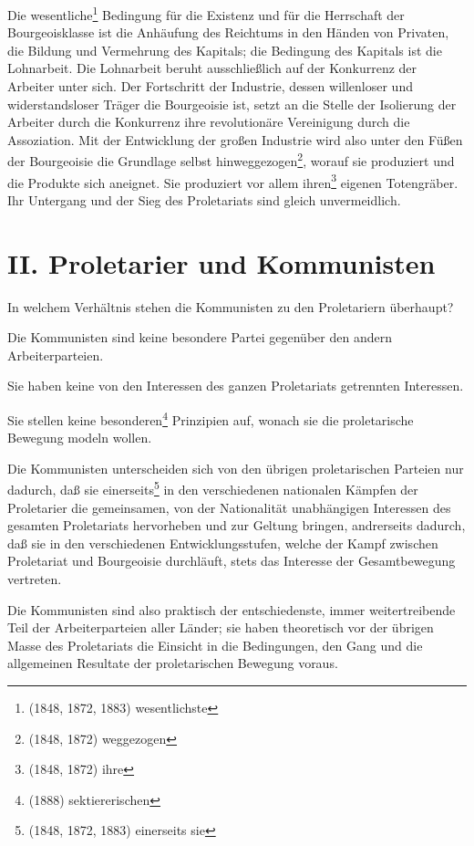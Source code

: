 \documentclass[letterpaper]{article}
\begin{document}
Die wesentliche\footnote{(1848, 1872, 1883) wesentlichste} Bedingung für die Existenz und für die Herrschaft der Bourgeoisklasse ist die Anhäufung des Reichtums in den Händen von Privaten, die Bildung und Vermehrung des Kapitals; die Bedingung des Kapitals ist die Lohnarbeit. Die Lohnarbeit beruht ausschließlich auf der Konkurrenz der Arbeiter unter sich. Der Fortschritt der Industrie, dessen willenloser und widerstandsloser Träger die Bourgeoisie ist, setzt an die Stelle der Isolierung der Arbeiter durch die Konkurrenz ihre revolutionäre Vereinigung durch die Assoziation. Mit der Entwicklung der großen Industrie wird also unter den Füßen der Bourgeoisie die Grundlage selbst hinweggezogen\footnote{(1848, 1872) weggezogen}, worauf sie produziert und die Produkte sich aneignet. Sie produziert vor allem ihren\footnote{(1848, 1872) ihre} eigenen Totengräber. Ihr Untergang und der Sieg des Proletariats sind gleich unvermeidlich.

\section{II. Proletarier und Kommunisten}

In welchem Verhältnis stehen die Kommunisten zu den Proletariern überhaupt?

Die Kommunisten sind keine besondere Partei gegenüber den andern Arbeiterparteien.

Sie haben keine von den Interessen des ganzen Proletariats getrennten Interessen.

Sie stellen keine besonderen\footnote{(1888) sektiererischen} Prinzipien auf, wonach sie die proletarische Bewegung modeln wollen.

Die Kommunisten unterscheiden sich von den übrigen proletarischen Parteien nur dadurch, daß sie einerseits\footnote{(1848, 1872, 1883) einerseits sie} in den verschiedenen nationalen Kämpfen der Proletarier die gemeinsamen, von der Nationalität unabhängigen Interessen des gesamten Proletariats hervorheben und zur Geltung bringen, andrerseits dadurch, daß sie in den verschiedenen Entwicklungsstufen, welche der Kampf zwischen Proletariat und Bourgeoisie durchläuft, stets das Interesse der Gesamtbewegung vertreten.

Die Kommunisten sind also praktisch der entschiedenste, immer weitertreibende Teil der Arbeiterparteien aller Länder; sie haben theoretisch vor der übrigen Masse des Proletariats die Einsicht in die Bedingungen, den Gang und die allgemeinen Resultate der proletarischen Bewegung voraus.
\end{document}
